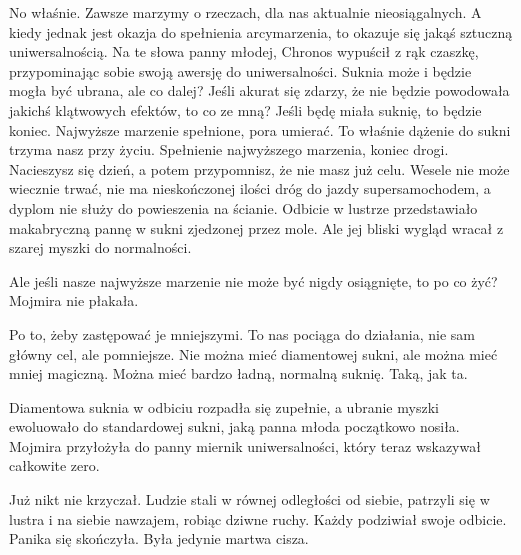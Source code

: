 \ds{} No właśnie. Zawsze marzymy o rzeczach, dla nas aktualnie nieosiągalnych.
A kiedy jednak jest okazja do spełnienia arcymarzenia, to okazuje się jakąś sztuczną uniwersalnością. \dm{} Na te słowa panny młodej, Chronos wypuścił z rąk czaszkę,
przypominając sobie swoją awersję do uniwersalności. \dm{} Suknia może i będzie mogła być ubrana, ale co dalej? Jeśli akurat się zdarzy, że nie będzie powodowała
jakichś klątwowych efektów, to co ze mną? Jeśli będę miała suknię, to będzie koniec. Najwyższe marzenie spełnione, pora umierać.
To właśnie dążenie do sukni trzyma nasz przy życiu. Spełnienie najwyższego marzenia, koniec drogi. Nacieszysz się dzień, a potem przypomnisz, że nie masz już celu.
Wesele nie może wiecznie trwać, nie ma nieskończonej ilości dróg do jazdy supersamochodem, a dyplom nie służy do powieszenia na ścianie. \dm{} Odbicie w lustrze przedstawiało makabryczną pannę w 
sukni zjedzonej przez mole. Ale jej bliski wygląd wracał z szarej myszki do normalności. \de{}

\ds{} Ale jeśli nasze najwyższe marzenie nie może być nigdy osiągnięte, to po co żyć? \dm{} Mojmira nie płakała. \de{}

\ds{} Po to, żeby zastępować je mniejszymi. To nas pociąga do działania, nie sam główny cel, ale pomniejsze. 
Nie można mieć diamentowej sukni, ale można mieć mniej magiczną. Można mieć bardzo ładną, normalną suknię.
Taką, jak ta. \de{} 

Diamentowa suknia w odbiciu rozpadła się zupełnie, a ubranie myszki ewoluowało do standardowej sukni, jaką panna młoda początkowo nosiła.
Mojmira przyłożyła do panny miernik uniwersalności, który teraz wskazywał całkowite zero.

\divider{}

Już nikt nie krzyczał. 
Ludzie stali w równej odległości od siebie, patrzyli się w lustra i na siebie nawzajem, robiąc dziwne ruchy.
Każdy podziwiał swoje odbicie. Panika się skończyła. Była jedynie martwa cisza.

